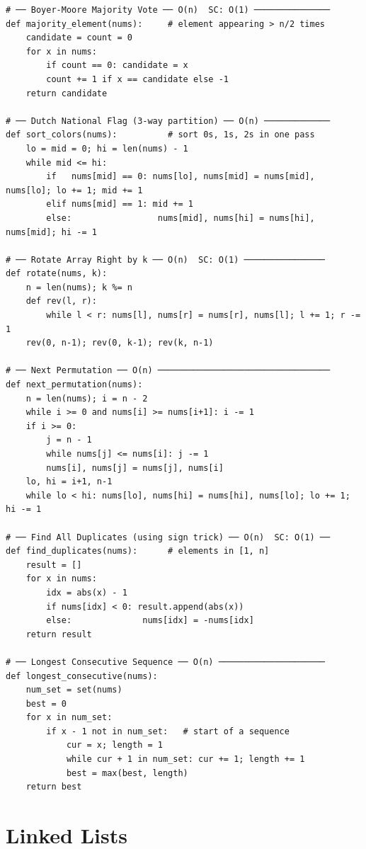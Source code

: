 \documentclass[11pt,a4paper]{report}
\begin{document}
\begin{lstlisting}
# ── Boyer-Moore Majority Vote ── O(n)  SC: O(1) ───────────────
def majority_element(nums):     # element appearing > n/2 times
    candidate = count = 0
    for x in nums:
        if count == 0: candidate = x
        count += 1 if x == candidate else -1
    return candidate

# ── Dutch National Flag (3-way partition) ── O(n) ─────────────
def sort_colors(nums):          # sort 0s, 1s, 2s in one pass
    lo = mid = 0; hi = len(nums) - 1
    while mid <= hi:
        if   nums[mid] == 0: nums[lo], nums[mid] = nums[mid], nums[lo]; lo += 1; mid += 1
        elif nums[mid] == 1: mid += 1
        else:                 nums[mid], nums[hi] = nums[hi], nums[mid]; hi -= 1

# ── Rotate Array Right by k ── O(n)  SC: O(1) ────────────────
def rotate(nums, k):
    n = len(nums); k %= n
    def rev(l, r):
        while l < r: nums[l], nums[r] = nums[r], nums[l]; l += 1; r -= 1
    rev(0, n-1); rev(0, k-1); rev(k, n-1)

# ── Next Permutation ── O(n) ──────────────────────────────────
def next_permutation(nums):
    n = len(nums); i = n - 2
    while i >= 0 and nums[i] >= nums[i+1]: i -= 1
    if i >= 0:
        j = n - 1
        while nums[j] <= nums[i]: j -= 1
        nums[i], nums[j] = nums[j], nums[i]
    lo, hi = i+1, n-1
    while lo < hi: nums[lo], nums[hi] = nums[hi], nums[lo]; lo += 1; hi -= 1

# ── Find All Duplicates (using sign trick) ── O(n)  SC: O(1) ──
def find_duplicates(nums):      # elements in [1, n]
    result = []
    for x in nums:
        idx = abs(x) - 1
        if nums[idx] < 0: result.append(abs(x))
        else:              nums[idx] = -nums[idx]
    return result

# ── Longest Consecutive Sequence ── O(n) ─────────────────────
def longest_consecutive(nums):
    num_set = set(nums)
    best = 0
    for x in num_set:
        if x - 1 not in num_set:   # start of a sequence
            cur = x; length = 1
            while cur + 1 in num_set: cur += 1; length += 1
            best = max(best, length)
    return best
\end{lstlisting}


\chapter{Linked Lists}
\end{document}
